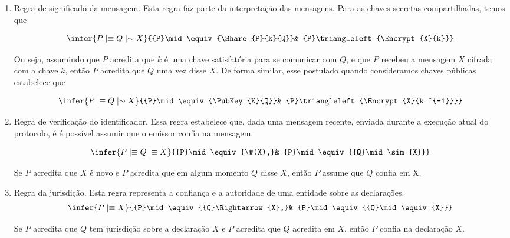 \begin{enumerate}[(P1)]

 \item Regra de significado da mensagem. Esta regra faz parte da interpretação das mensagens.
    Para as chaves secretas compartilhadas, temos que

    \begin{displaymath}
        \infer
        {{P}\mid\equiv{{Q}\mid\sim{X}}}
        {{P}\mid\equiv{\Share{P}{k}{Q}}& {P}\triangleleft{\Encrypt{X}{k}}}
    \end{displaymath}

Ou seja, assumindo que $P$ acredita que $k$ é uma chave satisfatória para se comunicar com $Q$, e que
$P$ recebeu a mensagem $X$ cifrada com a chave $k$, então $P$ acredita que $Q$ uma vez disse $X$.
De forma similar, esse postulado quando consideramos chaves p\'{u}blicas estabelece que

    \begin{displaymath}
        \infer
        {{P}\mid\equiv{{Q}\mid\sim{X}}}
        {{P}\mid\equiv{\PubKey{K}{Q}}& {P}\triangleleft{\Encrypt{X}{k ^{-1}}}}
    \end{displaymath}



\item Regra de verificação do identificador. Essa regra estabelece que, dada uma mensagem recente,
enviada durante a execução atual do protocolo, \'{e} \'{e} poss\'{i}vel
assumir que o emissor confia na mensagem.

  \begin{displaymath}
    \infer
    {{P}\mid\equiv{{Q}\mid\equiv{X}}}
    {{P}\mid\equiv{\#(X),}& {P}\mid\equiv{{Q}\mid\sim{X}}}
  \end{displaymath}

   Se $P$ acredita que $X$ é novo e $P$ acredita que em algum momento $Q$ disse $X$, então $P$ assume que $Q$ confia em X.

\item Regra da jurisdição. Esta regra representa a confiança e a autoridade de uma entidade sobre as declarações.
\begin{displaymath}
    \infer
    {{P}\mid\equiv{X}}
    {{P}\mid\equiv{{Q}\Rightarrow {X},}& {P}\mid\equiv{{Q}\mid\equiv{X}}}
  \end{displaymath}

   Se $P$  acredita que $Q$ tem jurisdição sobre a declaração $X$ e $P$ acredita que $Q$ acredita em $X$, então $P$ confia na declaração $X$.

\end{enumerate}


